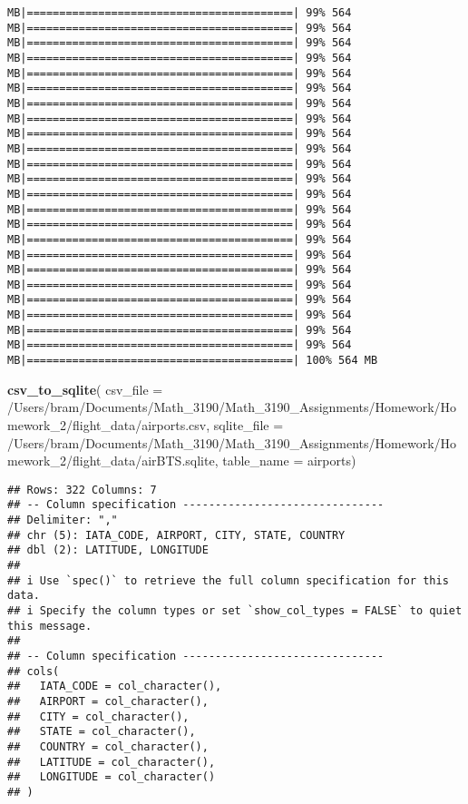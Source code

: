 \documentclass[
]{article}
\newenvironment{Shaded}{\begin{snugshade}}{\end{snugshade}}
\newcommand{\AttributeTok}[1]{\textcolor[rgb]{0.13,0.29,0.53}{#1}}
\newcommand{\FunctionTok}[1]{\textcolor[rgb]{0.13,0.29,0.53}{\textbf{#1}}}
\newcommand{\NormalTok}[1]{#1}
\newcommand{\StringTok}[1]{\textcolor[rgb]{0.31,0.60,0.02}{#1}}
\begin{document}
\begin{verbatim}
MB|=========================================| 99% 564 MB|=========================================| 99% 564 MB|=========================================| 99% 564 MB|=========================================| 99% 564 MB|=========================================| 99% 564 MB|=========================================| 99% 564 MB|=========================================| 99% 564 MB|=========================================| 99% 564 MB|=========================================| 99% 564 MB|=========================================| 99% 564 MB|=========================================| 99% 564 MB|=========================================| 99% 564 MB|=========================================| 99% 564 MB|=========================================| 99% 564 MB|=========================================| 99% 564 MB|=========================================| 99% 564 MB|=========================================| 99% 564 MB|=========================================| 99% 564 MB|=========================================| 99% 564 MB|=========================================| 99% 564 MB|=========================================| 99% 564 MB|=========================================| 99% 564 MB|=========================================| 99% 564 MB|=========================================| 100% 564 MB
\end{verbatim}

\begin{Shaded}
\begin{Highlighting}[]
\FunctionTok{csv\_to\_sqlite}\NormalTok{( }\AttributeTok{csv\_file =} \StringTok{\textquotesingle{}/Users/bram/Documents/Math\_3190/Math\_3190\_Assignments/Homework/Homework\_2/flight\_data/airports.csv\textquotesingle{}}\NormalTok{,}
               \AttributeTok{sqlite\_file =} \StringTok{\textquotesingle{}/Users/bram/Documents/Math\_3190/Math\_3190\_Assignments/Homework/Homework\_2/flight\_data/airBTS.sqlite\textquotesingle{}}\NormalTok{,}
               \AttributeTok{table\_name =} \StringTok{\textquotesingle{}airports\textquotesingle{}}\NormalTok{)}
\end{Highlighting}
\end{Shaded}

\begin{verbatim}
## Rows: 322 Columns: 7
## -- Column specification -------------------------------
## Delimiter: ","
## chr (5): IATA_CODE, AIRPORT, CITY, STATE, COUNTRY
## dbl (2): LATITUDE, LONGITUDE
## 
## i Use `spec()` to retrieve the full column specification for this data.
## i Specify the column types or set `show_col_types = FALSE` to quiet this message.
## 
## -- Column specification -------------------------------
## cols(
##   IATA_CODE = col_character(),
##   AIRPORT = col_character(),
##   CITY = col_character(),
##   STATE = col_character(),
##   COUNTRY = col_character(),
##   LATITUDE = col_character(),
##   LONGITUDE = col_character()
## )
\end{verbatim}
\end{document}
